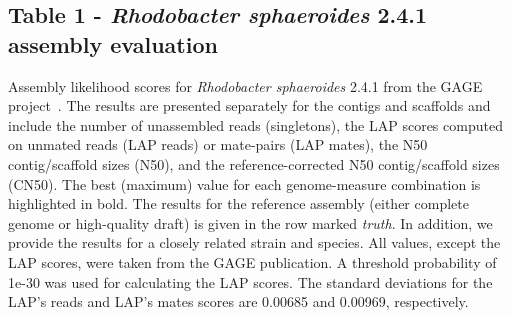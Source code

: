 \subsection{Table 1 - \emph{Rhodobacter sphaeroides} 2.4.1 assembly evaluation}
Assembly likelihood scores for \emph{Rhodobacter sphaeroides} 2.4.1 from the GAGE project~\cite{earl2011assemblathon}.  The results are presented
separately for the contigs and scaffolds and include the number of
unassembled reads (singletons), the LAP scores computed on unmated reads (LAP reads) or
mate-pairs (LAP mates), the N50 contig/scaffold sizes (N50),
and the reference-corrected N50 contig/scaffold sizes (CN50).
The best (maximum) value for each
genome-measure combination is highlighted in bold.
The results for the reference
assembly (either complete genome or high-quality draft) is given in the row
marked \emph{truth}.  In addition, we
provide the results for a closely related strain and species.
All values, except the LAP scores, were taken from the
GAGE publication. A threshold probability of 1e-30 was used for calculating the LAP scores. The standard deviations for the LAP's reads and LAP's mates scores are 0.00685 and 0.00969, respectively.

